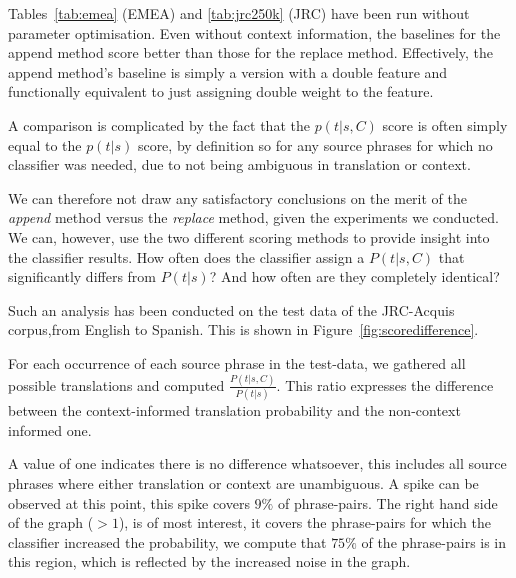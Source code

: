 \documentclass[smallextended]{svjour3}       %
\theoremstyle{break}
\begin{document}
Tables~\ref{tab:emea} (EMEA) and \ref{tab:jrc250k} (JRC) have been run without
parameter optimisation. Even without context information, the baselines for the
append method score better than those for the replace method. Effectively, the
append method's baseline is simply a version with a double feature and
functionally equivalent to just assigning double weight to the feature.

A comparison is complicated by the fact that the $p(t|s,C)$ score is often simply
equal to the $p(t|s)$ score, by definition so for any source phrases for which no
classifier was needed, due to not being ambiguous in translation or context. 

We can therefore not draw any satisfactory conclusions on the merit of the
\emph{append} method versus the \emph{replace} method, given the experiments we
conducted. We can, however, use the two different scoring methods to provide
insight into the classifier results. How often does the classifier assign a
$P(t|s,C)$ that significantly differs from $P(t|s)$? And how often are they
completely identical?

Such an analysis has been conducted on the test data of the JRC-Acquis
corpus,from English to Spanish. This is shown in
Figure~\ref{fig:scoredifference}. 

For each occurrence of each source phrase in the test-data, we gathered all
possible translations and computed $\frac{P(t|s,C)}{P(t|s)}$. This ratio
expresses the difference between the context-informed translation probability
and the non-context informed one.

A value of one indicates there is no difference whatsoever, this includes all
source phrases where either translation or context are unambiguous. A spike can
be observed at this point, this spike covers $9\%$ of phrase-pairs. The right
hand side of the graph ($>1$), is of most interest, it covers the phrase-pairs
for which the classifier increased the probability, we compute that $75\%$ of
the phrase-pairs is in this region, which is reflected by the increased
noise in the graph. 

\end{document}
